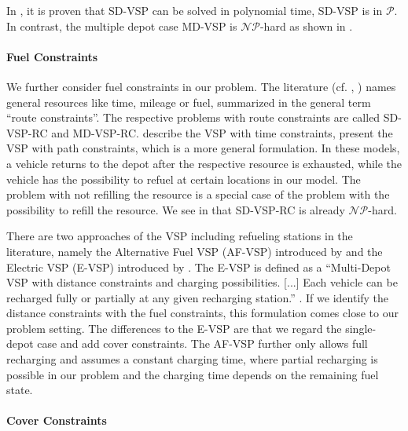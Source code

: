 In \cite{Dantzig_Fulkerson}, it is proven that SD-VSP can be solved in polynomial time, \ie SD-VSP is in $\mathcal{P}$. In contrast, the multiple depot case MD-VSP is $\mathcal{NP}$-hard as shown in \cite{Bertossi_Carraresi}.

\paragraph{Fuel Constraints} \parfill

We further consider fuel constraints in our problem. The literature (cf. \cite{Bunte_Kliewer}, \cite{Raff}) names general resources like time, mileage or fuel, summarized in the general term \enquote{route constraints}. The respective problems with route constraints are called SD-VSP-RC and MD-VSP-RC. \cite{Freling_Paixao} describe  the VSP with time constraints, \cite{Raff} present the VSP with path constraints, which is a more general formulation. In these models, a vehicle returns to the depot after the respective resource is exhausted, while the vehicle has the possibility to refuel at certain locations in our model. The problem with not refilling the resource is a special case of the problem with the possibility to refill the resource. We see in  that SD-VSP-RC is already $\mathcal{NP}$-hard.

There are two approaches of the VSP including refueling stations in the literature, namely the Alternative Fuel VSP (AF-VSP) introduced by \cite{Adler} and the Electric VSP (E-VSP) introduced by \cite{Wen}. The E-VSP is defined as a \enquote{Multi-Depot VSP with distance constraints and charging possibilities. [...] Each vehicle can be recharged fully or partially at any given recharging station.} \cite[p.~73]{Wen}. If we identify the distance constraints with the fuel constraints, this formulation comes close to our problem setting. The differences to the E-VSP are that we regard the single-depot case and add cover constraints. The AF-VSP further only allows full recharging and assumes a constant charging time, where partial recharging is possible in our problem and the charging time depends on the remaining fuel state.

\paragraph{Cover Constraints} \parfill


